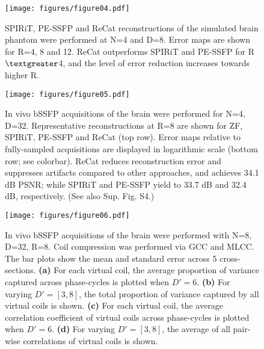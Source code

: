 \documentclass[11pt, onecolumn]{article}
\newcommand{\ohwidth}{0.75\columnwidth}
\newcommand{\swidth}{0.5\columnwidth}
\begin{document}
\begin{figure}[t]
	\begin{center}
		\texttt{[image: figures/figure04.pdf]}
		\caption{SPIRiT, PE-SSFP and ReCat reconstructions of the simulated brain phantom were performed at N=4 and D=8. Error maps are shown for R=4, 8 and 12. ReCat outperforms SPIRiT and PE-SSFP for R$\textgreater$4, and the level of error reduction increases towards higher R.
		}
		\label{fig:undersampling}
	\end{center}
\end{figure} 

\begin{figure}[t]
  \begin{center}
    \texttt{[image: figures/figure05.pdf]}
    \caption{In vivo bSSFP acquisitions of the brain were performed for N=4, D=32. Representative reconstructions at R=8 are shown for ZF, SPIRiT, PE-SSFP and ReCat (top row). Error maps relative to fully-sampled acquisitions are displayed in logarithmic scale (bottom row; see colorbar). ReCat reduces reconstruction error and suppresses artifacts compared to other approaches, and achieves 34.1 dB PSNR; while SPIRiT and PE-SSFP yield to 33.7 dB and 32.4 dB, respectively. (See also Sup. Fig. S4.)
    }
    \label{fig:invivo}
  \end{center}
\end{figure}  

\begin{figure}[t]
	\begin{center}
		\texttt{[image: figures/figure06.pdf]}
		\caption{In vivo bSSFP acquisitions of the brain were performed with N=8, D=32, R=8. Coil compression was performed via GCC and MLCC. The bar plots show the mean and standard error across 5 cross-sections. \textbf{(a)} For each virtual coil, the average proportion of variance captured across phase-cycles is plotted when $D'=6$. \textbf{(b)} For varying $D'=[3,8]$, the total proportion of variance captured by all virtual coils is shown. \textbf{(c)} For each virtual coil, the average correlation coefficient of virtual coils across phase-cycles is plotted when $D'=6$. \textbf{(d)} For varying $D'=[3,8]$, the average of all pair-wise correlations of virtual coils is shown. 	
		}
		\label{fig:ccinfo}
	\end{center}
\end{figure}
\end{document}
